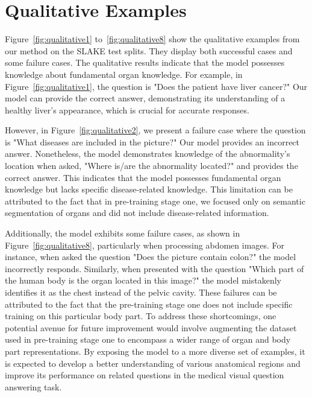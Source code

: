 \section{Qualitative Examples} \label{qualitativeResult}
Figure~\ref{fig:qualitative1} to~\ref{fig:qualitative8} show the qualitative examples from our method on the SLAKE test splits. They display both successful cases and some failure cases. The qualitative results indicate that the model possesses knowledge about fundamental organ knowledge. For example, in Figure~\ref{fig:qualitative1}, the question is "Does the patient have liver cancer?" Our model can provide the correct answer, demonstrating its understanding of a healthy liver's appearance, which is crucial for accurate responses.

However, in Figure~\ref{fig:qualitative2}, we present a failure case where the question is "What diseases are included in the picture?" Our model provides an incorrect answer. Nonetheless, the model demonstrates knowledge of the abnormality's location when asked, "Where is/are the abnormality located?" and provides the correct answer. This indicates that the model possesses fundamental organ knowledge but lacks specific disease-related knowledge. This limitation can be attributed to the fact that in pre-training stage one, we focused only on semantic segmentation of organs and did not include disease-related information.

Additionally, the model exhibits some failure cases, as shown in Figure~\ref{fig:qualitative8}, particularly when processing abdomen images. For instance, when asked the question "Does the picture contain colon?" the model incorrectly responds. Similarly, when presented with the question "Which part of the human body is the organ located in this image?" the model mistakenly identifies it as the chest instead of the pelvic cavity. These failures can be attributed to the fact that the pre-training stage one does not include specific training on this particular body part. To address these shortcomings, one potential avenue for future improvement would involve augmenting the dataset used in pre-training stage one to encompass a wider range of organ and body part representations. By exposing the model to a more diverse set of examples, it is expected to develop a better understanding of various anatomical regions and improve its performance on related questions in the medical visual question answering task.


